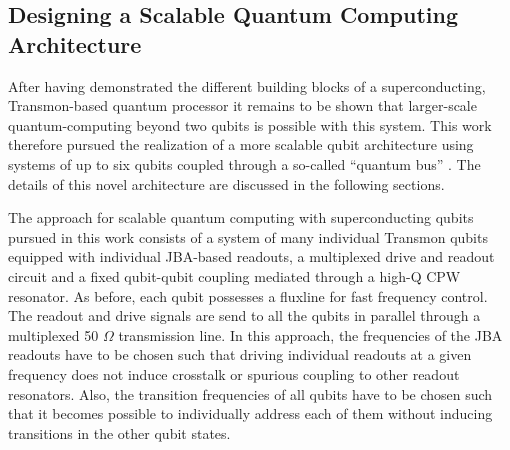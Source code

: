 \subsection{Designing a Scalable Quantum Computing Architecture}

After having demonstrated the different building blocks of a superconducting, Transmon-based quantum processor it remains to be shown that larger-scale quantum-computing beyond two qubits is possible with this system. This work therefore pursued the realization of a more scalable qubit architecture using systems of up to six qubits coupled through a so-called ``quantum bus'' \citep{majer_coupling_2007}. The details of this novel architecture are discussed in the following sections.

The approach for scalable quantum computing with superconducting qubits pursued in this work consists of a system of many individual Transmon qubits equipped with individual JBA-based readouts, a multiplexed drive and readout circuit and a fixed qubit-qubit coupling mediated through a high-Q CPW resonator. As before, each qubit possesses a fluxline for fast frequency control. The readout and drive signals are send to all the qubits in parallel through a multiplexed 50 $\Omega$ transmission line. In this approach, the frequencies of the JBA readouts have to be chosen such that driving individual readouts at a given frequency does not induce crosstalk or spurious coupling to other readout resonators. Also, the transition frequencies of all qubits have to be chosen such that it becomes possible to individually address each of them without inducing transitions in the other qubit states.

